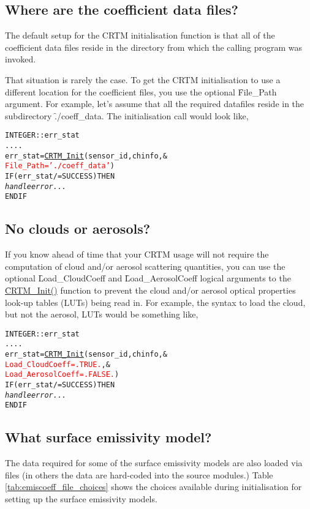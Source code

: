\subsection{Where are the coefficient data files?}
The default setup for the CRTM initialisation function is that all of the coefficient data files reside in the directory from which the calling program was invoked.

That situation is rarely the case. To get the CRTM initialisation to use a different location for the coefficient files, you use the optional \f{File\_Path} argument. For example, let's assume that all the required datafiles reside in the subdirectory \f{./coeff\_data}. The initialisation call would look like,

\begin{alltt}
  INTEGER :: err_stat
  ....
  err_stat = \hyperref[sec:CRTM_Init_interface]{CRTM_Init}( sensor_id, chinfo, &
                        \textcolor{red}{File_Path = './coeff_data'} )
  IF ( err_stat /= SUCCESS ) THEN
    \textrm{\textit{handle error...}}
  END IF\end{alltt}


\subsection{No clouds or aerosols?}
If you know ahead of time that your CRTM usage will not require the computation of cloud and/or aerosol scattering quantities, you can use the optional \f{Load\_CloudCoeff} and \f{Load\_AerosolCoeff} logical arguments to the \hyperref[sec:CRTM_Init_interface]{\f{CRTM\_Init()}} function to prevent the cloud and/or aerosol optical properties look-up tables (LUTs) being read in. For example, the syntax to load the cloud, but not the aerosol, LUTs would be something like,

\begin{alltt}
  INTEGER :: err_stat
  ....
  err_stat = \hyperref[sec:CRTM_Init_interface]{CRTM_Init}( sensor_id, chinfo, &
                        \textcolor{red}{Load_CloudCoeff   = .TRUE.}, &
                        \textcolor{red}{Load_AerosolCoeff = .FALSE.} )
  IF ( err_stat /= SUCCESS ) THEN
    \textrm{\textit{handle error...}}
  END IF\end{alltt}


\subsection{What surface emissivity model?}
\label{sec:init_step-surface_emissivity_model}
The data required for some of the surface emissivity models are also loaded via files (in others the data are hard-coded into the source modules.) Table \ref{tab:emiscoeff_file_choices} shows the choices available during initialisation for setting up the surface emissivity models.

